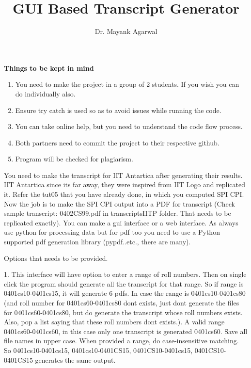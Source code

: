 \documentclass{article}
\title{GUI Based Transcript Generator }
\author{Dr. Mayank Agarwal}
\begin{document}
	\maketitle  
	\textbf{Things to be kept in mind} 
	\begin{enumerate}
\item You need to make the project in a group of 2 students. If you wish you 
can do individually also.  

\item Ensure try catch is used so as to avoid issues while running the code. 

\item You can take online help, but you need to understand the code flow 
process.

\item Both partners need to commit the project to their respective github. 
\item Program will be checked for plagiarism.   
\end{enumerate}


You need to make the transcript for IIT Antartica after generating their 
results.  IIT Antartica since its far away, they were inspired from IIT Logo 
and replicated it. Refer the tut05 that you have already done, in which you
computed SPI CPI. Now 
the job is to make the SPI CPI output into a PDF for transcript (Check sample 
transcript: 0402CS99.pdf in 	transcriptsIITP folder. That needs to be 
replicated exactly). You can make a 
gui interface or a web interface. As always use python for processing  data but 
for pdf too you need to use a Python supported pdf generation library 
(pypdf..etc., there are many).

Options that needs to be provided. 

1. This 
interface will have option to enter a range of roll numbers. Then on single 
click the program should generate  all the transcript for that range. So if 
range is 0401cs10-0401cs15, it will generate 6 pdfs. In case the range is 
0401cs10-0401cs80 (and roll number for 0401cs60-0401cs80 dont exists, just dont 
generate the files for 0401cs60-0401cs80, but do generate the transcript whose 
roll numbers exists. Also, pop a list saying that these roll numbers dont 
exists.). A valid range 0401cs60-0401cs60, in this case only one transcript is 
generated 0401cs60. Save all file names in upper case. When provided a range, 
do case-insensitive matching. So  0401cs10-0401cs15,  0401cs10-0401CS15,  
0401CS10-0401cs15,  0401CS10-0401CS15 generates the same output. 
\end{document}
